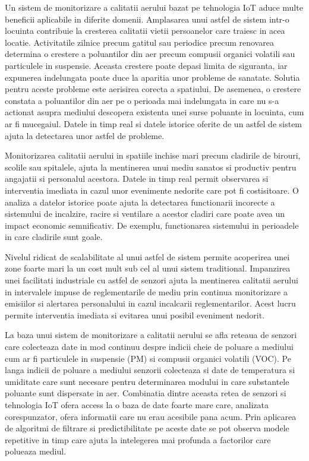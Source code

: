 Un sistem de monitorizare a calitatii aerului bazat pe tehnologia IoT aduce multe beneficii aplicabile in diferite domenii. Amplasarea unui astfel de sistem intr-o 
locuinta contribuie la cresterea calitatii vietii persoanelor care traiesc in acea locatie. Activitatile zilnice precum gatitul sau periodice precum renovarea 
determina o crestere a poluantilor din aer precum compusii organici volatili sau particulele in suspensie. Aceasta crestere poate depasi limita de siguranta, iar 
expunerea indelungata poate duce la aparitia unor probleme de sanatate. Solutia pentru aceste probleme este aerisirea corecta a spatiului. De asemenea, o crestere 
constata a poluantilor din aer pe o perioada mai indelungata in care nu s-a actionat asupra mediului descopera existenta unei surse poluante in locuinta, cum ar fi 
mucegaiul. Datele in timp real si datele istorice oferite de un astfel de sistem ajuta la detectarea unor astfel de probleme.

Monitorizarea calitatii aerului in spatiile inchise mari precum cladirile de birouri, scolile sau spitalele, ajuta la mentinerea unui mediu sanatos si 
productiv pentru angajatii si personalul acestora. Datele in timp real permit observarea si interventia imediata in cazul unor evenimente nedorite care 
pot fi costisitoare. O analiza a datelor istorice poate ajuta la detectarea functionarii incorecte a sistemului de incalzire, racire si ventilare a acestor 
cladiri care poate avea un impact economic semnificativ. De exemplu, functionarea sistemului in perioadele in care cladirile sunt goale.

Nivelul ridicat de scalabilitate al unui astfel de sistem permite acoperirea unei zone foarte mari la un cost mult sub cel al unui sistem traditional. Impanzirea 
unei facilitati industriale cu astfel de senzori ajuta la mentinerea calitatii aerului in intervalele impuse de reglementarile de mediu prin continua monitorizare 
a emisiilor si alertarea personalului in cazul incalcarii reglementarilor. Acest lucru permite interventia imediata si evitarea unui posibil eveniment nedorit.

La baza unui sistem de monitorizare a calitatii aerului se afla reteaua de senzori care colecteaza date in mod continuu despre indicii cheie de poluare a mediului 
cum ar fi particulele in suspensie (PM) si compusii organici volatili (VOC). Pe langa indicii de poluare a mediului senzorii colecteaza si date de temperatura si umiditate 
care sunt necesare pentru determinarea modului in care substantele poluante sunt dispersate in aer. Combinatia dintre aceasta retea de senzori si tehnologia IoT 
ofera access la o baza de date foarte mare care, analizata corespunzator, ofera informatii care nu erau acesibile pana acum. Prin aplicarea de algoritmi de filtrare 
si predictibilitate pe aceste date se pot observa modele repetitive in timp care ajuta la intelegerea mai profunda a factorilor care polueaza mediul.

